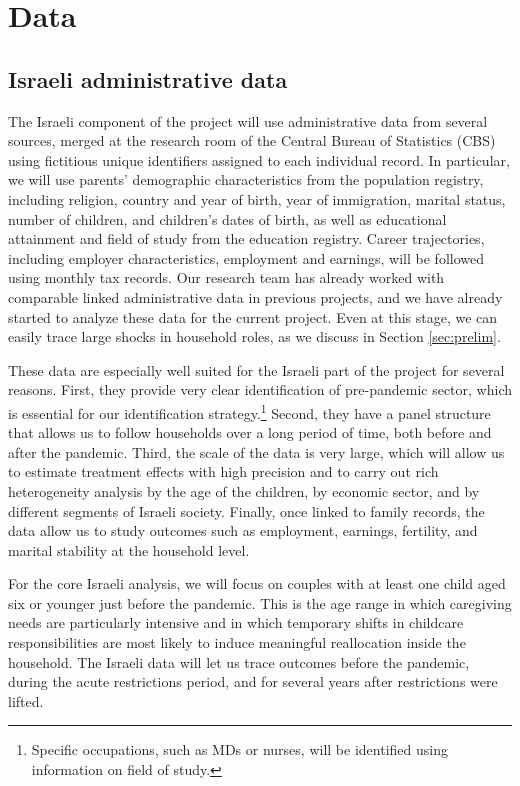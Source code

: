 \documentclass[12pt]{article}
\begin{document}
\section{Data}

\subsection{Israeli administrative data}

The Israeli component of the project will use administrative data from several sources, merged at the research room of the Central Bureau of Statistics (CBS) using fictitious unique identifiers assigned to each individual record. In particular, we will use parents' demographic characteristics from the population registry, including religion, country and year of birth, year of immigration, marital status, number of children, and children's dates of birth, as well as educational attainment and field of study from the education registry. Career trajectories, including employer characteristics, employment and earnings, will be followed using monthly tax records. Our research team has already worked with comparable linked administrative data in previous projects, and we have already started to analyze these data for the current project. Even at this stage, we can easily trace large shocks in household roles, as we discuss in Section \ref{sec:prelim}.

These data are especially well suited for the Israeli part of the project for several reasons. First, they provide very clear identification of pre-pandemic sector, which is essential for our identification strategy.\footnote{Specific occupations, such as MDs or nurses, will be identified using information on field of study.} Second, they have a panel structure that allows us to follow households over a long period of time, both before and after the pandemic. Third, the scale of the data is very large, which will allow us to estimate treatment effects with high precision and to carry out rich heterogeneity analysis by the age of the children, by economic sector, and by different segments of Israeli society. Finally, once linked to family records, the data allow us to study outcomes such as employment, earnings, fertility, and marital stability at the household level.

For the core Israeli analysis, we will focus on couples with at least one child aged six or younger just before the pandemic. This is the age range in which caregiving needs are particularly intensive and in which temporary shifts in childcare responsibilities are most likely to induce meaningful reallocation inside the household. The Israeli data will let us trace outcomes before the pandemic, during the acute restrictions period, and for several years after restrictions were lifted.
\end{document}

